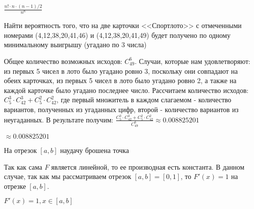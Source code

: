 \begin{result}
$\frac{n! \cdot n \cdot (n - 1) / 2}{n^n}$
\end{result}


\medskip
\begin{task}{14}
Найти вероятность того, что на две карточки <<Спортлото>> с отмеченными номерами
(4,12,38,20,41,46) и (4,12,38,20,41,49) будет получено по одному минимальному выигрышу (угадано по 3
числа)
\end{task}

\begin{solution}
Общее количество возможных исходов: $C_{49}^6$. Случаи, которые нам удовлетворяют: 
из первых 5 чисел в лото было угадано ровно 3, поскольку они совпадают на обеих карточках, из 
первых 5 чисел в лото было угадано ровно 2, а также на каждой карточке было угадано последнее число.
Рассчитаем количество исходов: $C_5^3 \cdot  C_{42}^3 + C_5^2 \cdot C_{42}^2$, где первый множитель
в каждом слагаемом - количество вариантов, полученных из угаданных цифр, второй - количество вариантов
из неугаданных. В результате получим: $\frac{C_5^3 \cdot  C_{42}^3 + C_5^2 \cdot C_{42}^2}{C_{49}^6} \approx 
0.008825201$
\end{solution}

\begin{result}
$\approx 0.008825201$
\end{result}


\medskip
\begin{task}{15}
На отрезок $\left[a, b\right]$ наудачу брошена точка
\end{task}

\begin{solution}
Так как сама $F$ является линейной, то ее производная есть константа. В данном случае, 
так как мы рассматриваем отрезок $\left[a, b\right] = \left[0, 1\right] $, то $F'(x) = 1$ на отрезке 
$\left[a, b\right] $.
\end{solution}

\begin{result}
$F'(x) = 1, x \in \left[a, b\right]$
\end{result}

